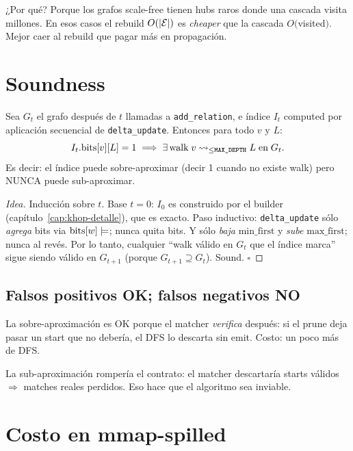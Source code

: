 ¿Por qué? Porque los grafos scale-free tienen hubs raros donde una
cascada visita millones. En esos casos el rebuild \(O(|\mathcal{E}|)\) es
\emph{cheaper} que la cascada \(O(\)visited\()\). Mejor caer al
rebuild que pagar más en propagación.

\section{Soundness}

\begin{theorem}
Sea \(G_t\) el grafo después de \(t\) llamadas a
\texttt{add\_relation}, e índice \(I_t\) computed por aplicación
secuencial de \texttt{delta\_update}. Entonces para todo \(v\) y
\(L\):
\[
I_t.\mathrm{bits}[v][L] = 1 \implies \exists\,\text{walk}\;v
\rightsquigarrow_{\leq \texttt{MAX\_DEPTH}} L\;\text{en}\;G_t.
\]
Es decir: el índice puede sobre-aproximar (decir 1 cuando no
existe walk) pero NUNCA puede sub-aproximar.
\end{theorem}

\begin{proof}[Idea]
Inducción sobre \(t\). Base \(t=0\): \(I_0\) es construido por el
builder (capítulo~\ref{cap:khop-detalle}), que es exacto. Paso
inductivo: \texttt{delta\_update} sólo \emph{agrega} bits via
\(\mathrm{bits}[w] \mathrel{|}\!=\); nunca quita bits. Y sólo
\emph{baja} \(\mathrm{min\_first}\) y \emph{sube}
\(\mathrm{max\_first}\); nunca al revés. Por lo tanto, cualquier
``walk válido en \(G_t\) que el índice marca'' sigue siendo válido
en \(G_{t+1}\) (porque \(G_{t+1} \supseteq G_t\)). Sound. \(\square\)
\end{proof}

\subsection{Falsos positivos OK; falsos negativos NO}

La sobre-aproximación es OK porque el matcher \emph{verifica}
después: si el prune deja pasar un start que no debería, el DFS
lo descarta sin emit. Costo: un poco más de DFS.

La sub-aproximación rompería el contrato: el matcher descartaría
starts válidos $\Rightarrow$ matches reales perdidos. Eso hace que
el algoritmo sea inviable.

\section{Costo en mmap-spilled}

